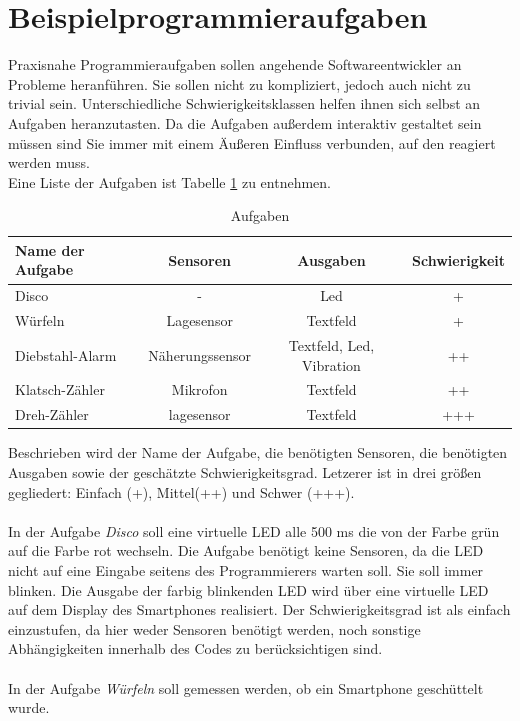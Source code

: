 \documentclass[11pt,a4paper]{report}
\begin{document}
\section{Beispielprogrammieraufgaben}\label{sec:activities}
Praxisnahe Programmieraufgaben sollen angehende Softwareentwickler an Probleme heranführen.
Sie sollen nicht zu kompliziert, jedoch auch nicht zu trivial sein.
Unterschiedliche Schwierigkeitsklassen helfen ihnen sich selbst an Aufgaben heranzutasten.
Da die Aufgaben außerdem interaktiv gestaltet sein müssen sind Sie immer mit einem Äußeren Einfluss verbunden, auf den reagiert werden muss.
\\
Eine Liste der Aufgaben ist Tabelle \ref{tab:excercises} zu entnehmen.
\begin{table}[htbp]
  \centering
  \begin{tabular}{|l|c|c|c|}
      \hline
      Name der Aufgabe & Sensoren & Ausgaben & Schwierigkeit \\
      \hline
      Disco & - & Led & + \\
      \hline
      Würfeln & Lagesensor & Textfeld &+ \\
      \hline
      Diebstahl-Alarm & Näherungssensor & Textfeld, Led, Vibration & ++ \\
      \hline
      Klatsch-Zähler & Mikrofon & Textfeld & ++ \\
      \hline
      Dreh-Zähler & lagesensor & Textfeld & +++ \\
      \hline
  \end{tabular}
  \caption{Aufgaben}
  \label{tab:excercises}
\end{table}
Beschrieben wird der Name der Aufgabe, die benötigten Sensoren, die benötigten Ausgaben sowie der geschätzte Schwierigkeitsgrad.
Letzerer ist in drei größen gegliedert:
Einfach (+), Mittel(++) und Schwer (+++).
\\\\
In der Aufgabe \textit{Disco} soll eine virtuelle LED alle 500 ms die von der Farbe grün auf die Farbe rot wechseln.
Die Aufgabe benötigt keine Sensoren, da die LED nicht auf eine Eingabe seitens des Programmierers warten soll.
Sie soll immer blinken.
Die Ausgabe der farbig blinkenden LED wird über eine virtuelle LED auf dem Display des Smartphones realisiert.
Der Schwierigkeitsgrad ist als einfach einzustufen, da hier weder Sensoren benötigt werden, noch sonstige Abhängigkeiten innerhalb des Codes zu berücksichtigen sind.
\\\\
In der Aufgabe \textit{Würfeln} soll gemessen werden, ob ein Smartphone geschüttelt wurde.
\end{document}
